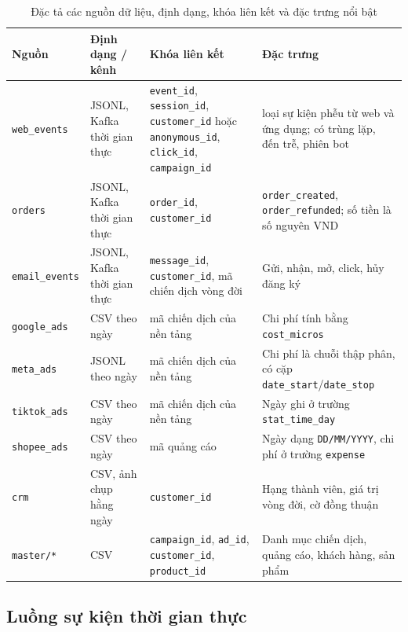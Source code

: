 \begin{table}[!htbp]
\centering
\caption{Đặc tả các nguồn dữ liệu, định dạng, khóa liên kết và đặc trưng nổi bật}
\label{tab:sources}
\small
\renewcommand{\arraystretch}{1.2}
\begin{tabularx}{\textwidth}{>{\raggedright\arraybackslash}p{2.5cm} >{\raggedright\arraybackslash}p{2.2cm} >{\raggedright\arraybackslash}p{4.8cm} >{\raggedright\arraybackslash}X}
\toprule
\textbf{Nguồn} & \textbf{Định dạng / kênh} & \textbf{Khóa liên kết} & \textbf{Đặc trưng} \\
\midrule
\texttt{web\_events} & JSONL, Kafka thời gian thực & \texttt{event\_id}, \texttt{session\_id}, \texttt{customer\_id} hoặc \texttt{anonymous\_id}, \texttt{click\_id}, \texttt{campaign\_id} & 5 loại sự kiện phễu từ web và ứng dụng; có trùng lặp, đến trễ, phiên bot \\
\texttt{orders} & JSONL, Kafka thời gian thực & \texttt{order\_id}, \texttt{customer\_id} & \texttt{order\_created}, \texttt{order\_refunded}; số tiền là số nguyên VND \\
\texttt{email\_events} & JSONL, Kafka thời gian thực & \texttt{message\_id}, \texttt{customer\_id}, mã chiến dịch vòng đời & Gửi, nhận, mở, click, hủy đăng ký \\
\texttt{google\_ads} & CSV theo ngày & mã chiến dịch của nền tảng & Chi phí tính bằng \texttt{cost\_micros} \\
\texttt{meta\_ads} & JSONL theo ngày & mã chiến dịch của nền tảng & Chi phí là chuỗi thập phân, có cặp \texttt{date\_start}/\texttt{date\_stop} \\
\texttt{tiktok\_ads} & CSV theo ngày & mã chiến dịch của nền tảng & Ngày ghi ở trường \texttt{stat\_time\_day} \\
\texttt{shopee\_ads} & CSV theo ngày & mã quảng cáo & Ngày dạng \texttt{DD/MM/YYYY}, chi phí ở trường \texttt{expense} \\
\texttt{crm} & CSV, ảnh chụp hằng ngày & \texttt{customer\_id} & Hạng thành viên, giá trị vòng đời, cờ đồng thuận \\
\texttt{master/*} & CSV & \texttt{campaign\_id}, \texttt{ad\_id}, \texttt{customer\_id}, \texttt{product\_id} & Danh mục chiến dịch, quảng cáo, khách hàng, sản phẩm \\
\bottomrule
\end{tabularx}
\end{table}

\subsection{Luồng sự kiện thời gian thực}
\label{sec:c2-luong-su-kien}


